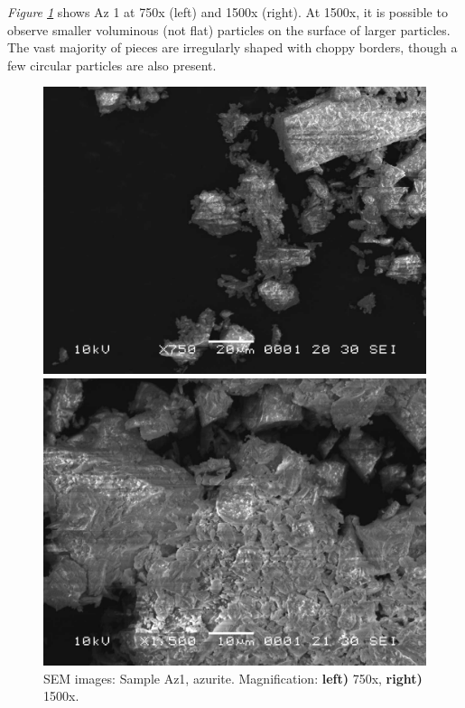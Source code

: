 \textit{Figure \ref{fig:az1_sem_2}} shows Az 1 at 750x (left) and 1500x (right). At 1500x, it is possible to observe smaller voluminous (not flat) particles on the surface of larger particles. The vast majority of pieces are irregularly shaped with choppy borders, though a few circular particles are also present.

\begin{figure}[H]
\centering
\begin{minipage}{.45\textwidth}
  \centering
  \includegraphics[width=\linewidth]{Az1_x750_6_220221}
\end{minipage}
\begin{minipage}{.45\textwidth}
  \centering
  \includegraphics[width=\linewidth]{Az1_x1500_2_220221}
\end{minipage}
\caption[SEM images: Sample Az1, azurite]{SEM images: Sample Az1, azurite. Magnification: \textbf{left)} 750x, \textbf{right)} 1500x.}
\label{fig:az1_sem_2}
\end{figure}

